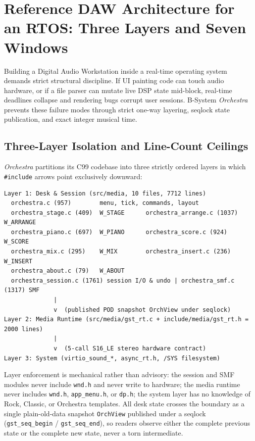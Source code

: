 \chapter{Reference DAW Architecture for an RTOS: Three Layers and Seven Windows}
\label{ch:daw-arch}

Building a Digital Audio Workstation inside a real-time operating system demands strict structural discipline. If UI painting code can touch audio hardware, or if a file parser can mutate live DSP state mid-block, real-time deadlines collapse and rendering bugs corrupt user sessions. B-System \emph{Orchestra} prevents these failure modes through strict one-way layering, seqlock state publication, and exact integer musical time.

\section{Three-Layer Isolation and Line-Count Ceilings}

\emph{Orchestra} partitions its C99 codebase into three strictly ordered layers in which \texttt{\#include} arrows point exclusively downward:

\begin{lstlisting}[caption={Three-layer architecture of B-System Orchestra (arrows point strictly down).}]
Layer 1: Desk & Session (src/media, 10 files, 7712 lines)
  orchestra.c (957)        menu, tick, commands, layout
  orchestra_stage.c (409)  W_STAGE      orchestra_arrange.c (1037) W_ARRANGE
  orchestra_piano.c (697)  W_PIANO      orchestra_score.c (924)    W_SCORE
  orchestra_mix.c (295)    W_MIX        orchestra_insert.c (236)   W_INSERT
  orchestra_about.c (79)   W_ABOUT
  orchestra_session.c (1761) session I/O & undo | orchestra_smf.c (1317) SMF
              |
              v  (published POD snapshot OrchView under seqlock)
Layer 2: Media Runtime (src/media/gst_rt.c + include/media/gst_rt.h = 2000 lines)
              |
              v  (5-call S16_LE stereo hardware contract)
Layer 3: System (virtio_sound_*, async_rt.h, /SYS filesystem)
\end{lstlisting}

Layer enforcement is mechanical rather than advisory: the session and SMF modules never include \texttt{wnd.h} and never write to hardware; the media runtime never includes \texttt{wnd.h}, \texttt{app\_menu.h}, or \texttt{dp.h}; the system layer has no knowledge of Rock, Classic, or Orchestra templates. All desk state crosses the boundary as a single plain-old-data snapshot \texttt{OrchView} published under a seqlock (\texttt{gst\_seq\_begin} / \texttt{gst\_seq\_end}), so readers observe either the complete previous state or the complete new state, never a torn intermediate.

